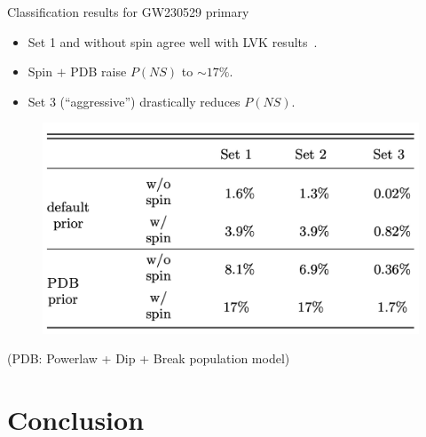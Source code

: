 \documentclass[usenames,dvipsnames,t]{beamer}
\begin{document}
\begin{frame}{Classification results for GW230529 primary}

  \def\x{2mm}

  \begin{itemize}
    \vspace{\x}
    \item Set 1 and without spin agree well with LVK results~\cite{LIGOScientific:2024elc}. 

    \vspace{\x}

    \item Spin $+$ \textsc{PDB} raise $P(NS)$ to $\sim 17\%$.

    \vspace{\x}

    \item Set 3 (``aggressive'') drastically reduces $P(NS)$.
  \end{itemize}

  \begin{figure}
    \centering
    \includegraphics[width=0.7\linewidth]{Figures/extreme_matter_P_ns_table.jpg}
  \end{figure}
  \footnotesize
  \begin{center} 
    (\textsc{PDB}: Powerlaw + Dip + Break population model) 
  \end{center}
  \normalsize


\end{frame}


\section{Conclusion}
\end{document}
